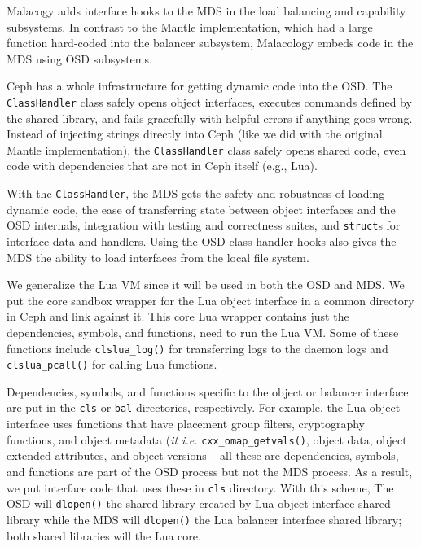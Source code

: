 \documentclass[10pt,twocolumn]{article}
\begin{document}
Malacogy adds interface hooks to the MDS in the load balancing and
capability subsystems. In contrast to the Mantle implementation, which
had a large function hard-coded into the balancer subsystem, Malacology
embeds code in the MDS using OSD subsystems.

Ceph has a whole
infrastructure for getting dynamic code into the OSD. The
\texttt{ClassHandler} class safely opens object interfaces, executes
commands defined by the shared library, and fails gracefully with
helpful errors if anything goes wrong. Instead of injecting strings
directly into Ceph (like we did with the original Mantle
implementation), the \texttt{ClassHandler} class safely opens shared
code, even code with dependencies that are not in Ceph itself (e.g.,
Lua).

With the \texttt{ClassHandler}, the MDS gets the safety and robustness
of loading dynamic code, the ease of transferring state between object
interfaces and the OSD internals, integration with testing and
correctness suites, and \texttt{struct}s for interface data and
handlers. Using the OSD class handler hooks also gives the MDS the
ability to load interfaces from the local file system.

We generalize the Lua VM since it will be used in both the OSD and MDS.
We put the core sandbox wrapper for the Lua object interface in a common
directory in Ceph and link against it. This core Lua wrapper contains
just the dependencies, symbols, and functions, need to run the Lua VM.
Some of these functions include \texttt{clslua\_log()} for transferring
logs to the daemon logs and \texttt{clslua\_pcall()} for calling Lua
functions.

Dependencies, symbols, and functions specific to the object or balancer
interface are put in the \texttt{cls} or \texttt{bal} directories,
respectively. For example, the Lua object interface uses functions that
have placement group filters, cryptography functions, and object
metadata (\emph{it i.e.} \texttt{cxx\_omap\_getvals()}, object data,
object extended attributes, and object versions -- all these are
dependencies, symbols, and functions are part of the OSD process but not
the MDS process. As a result, we put interface code that uses these in
\texttt{cls} directory. With this scheme, The OSD will \texttt{dlopen()}
the shared library created by Lua object interface shared library while
the MDS will \texttt{dlopen()} the Lua balancer interface shared
library; both shared libraries will the Lua core.
\fi
\end{document}
